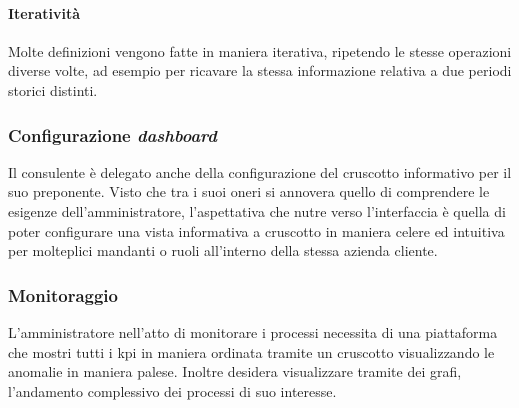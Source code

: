 \paragraph{Iteratività} Molte definizioni vengono fatte in maniera iterativa, ripetendo le stesse operazioni diverse volte, ad esempio per ricavare la stessa informazione relativa a due periodi storici distinti.
\subsubsection{Configurazione \textit{dashboard}}
Il consulente è delegato anche della configurazione del cruscotto informativo per il suo preponente. Visto che tra i suoi oneri si annovera quello di comprendere le esigenze dell'amministratore, l'aspettativa che nutre verso l'interfaccia è quella di poter configurare una vista informativa a cruscotto in maniera celere ed intuitiva per molteplici mandanti o ruoli all'interno della stessa azienda cliente.

\subsubsection{Monitoraggio}
L'amministratore nell'atto di monitorare i processi necessita di una piattaforma che mostri tutti i \acrshort{kpi} in maniera ordinata tramite un cruscotto visualizzando le anomalie in maniera palese.  Inoltre desidera visualizzare tramite dei grafi, l'andamento complessivo dei processi di suo interesse.
\newpage
